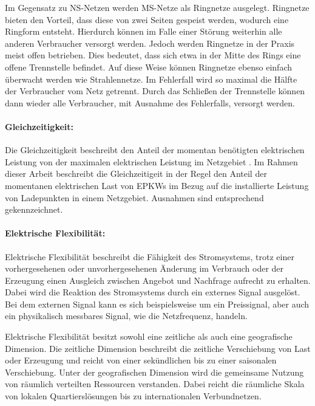 Im Gegensatz zu \gls{NS}-Netzen werden \gls{MS}-Netze als Ringnetze ausgelegt.
Ringnetze bieten den Vorteil, dass diese von zwei Seiten gespeist werden, wodurch eine Ringform entsteht.
Hierdurch können im Falle einer Störung weiterhin alle anderen Verbraucher versorgt werden.
Jedoch werden Ringnetze in der Praxis meist offen betrieben.
Dies bedeutet, dass sich etwa in der Mitte des Rings eine offene Trennstelle befindet.
Auf diese Weise können Ringnetze ebenso einfach überwacht werden wie Strahlennetze.
Im Fehlerfall wird so maximal die Hälfte der Verbraucher vom Netz getrennt.
Durch das Schließen der Trennstelle können dann wieder alle Verbraucher, mit Ausnahme des Fehlerfalls, versorgt werden. \cite{WNG2020} \cite{Westermann2019}


\paragraph{Gleichzeitigkeit:}

Die Gleichzeitigkeit beschreibt den Anteil der momentan benötigten elektrischen Leistung von der maximalen elektrischen Leistung im Netzgebiet \cite{Agora2019}.
Im Rahmen dieser Arbeit beschreibt die Gleichzeitigeit in der Regel den Anteil der momentanen elektrischen Last von \glspl{EPKW} im Bezug auf die installierte Leistung von Ladepunkten in einem Netzgebiet.
Ausnahmen sind entsprechend gekennzeichnet.


\paragraph{Elektrische Flexibilität:}

Elektrische Flexibilität beschreibt die Fähigkeit des Stromsystems, trotz einer vorhergesehenen oder unvorhergesehenen Änderung im Verbrauch oder der Erzeugung einen Ausgleich zwischen Angebot und Nachfrage aufrecht zu erhalten.
Dabei wird die Reaktion des Stromsystems durch ein externes Signal ausgelöst.
Bei dem externen Signal kann es sich beispielsweise um ein Preissignal, aber auch ein physikalisch messbares Signal, wie die Netzfrequenz, handeln. \medskip

Elektrische Flexibilität besitzt sowohl eine zeitliche als auch eine geografische Dimension.
Die zeitliche Dimension beschreibt die zeitliche Verschiebung von Last oder Erzeugung und reicht von einer sekündlichen bis zu einer saisonalen Verschiebung.
Unter der geografischen Dimension wird die gemeinsame Nutzung von räumlich verteilten Ressourcen verstanden.
Dabei reicht die räumliche Skala von lokalen Quartierslösungen bis zu internationalen Verbundnetzen. \cite{BNetzA2017} \cite{IEA2014}


